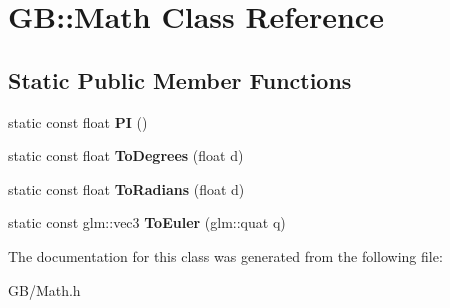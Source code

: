 \hypertarget{class_g_b_1_1_math}{}\section{GB\+::Math Class Reference}
\label{class_g_b_1_1_math}
\subsection*{Static Public Member Functions}
\begin{DoxyCompactItemize}
\item 
\mbox{\label{class_g_b_1_1_math_a294566c198982cf90fdf4ba931d97614}} 
static const float {\bfseries PI} ()
\item 
\mbox{\label{class_g_b_1_1_math_a08a28269fbe435137390d394f4586be4}} 
static const float {\bfseries To\+Degrees} (float d)
\item 
\mbox{\label{class_g_b_1_1_math_a6478790d507b1dbb1c3bd423bb8420b9}} 
static const float {\bfseries To\+Radians} (float d)
\item 
\mbox{\label{class_g_b_1_1_math_a89ee20d975e3bdbd076406a2b64935a7}} 
static const glm\+::vec3 {\bfseries To\+Euler} (glm\+::quat q)
\end{DoxyCompactItemize}


The documentation for this class was generated from the following file\+:\begin{DoxyCompactItemize}
\item 
G\+B/Math.\+h\end{DoxyCompactItemize}
